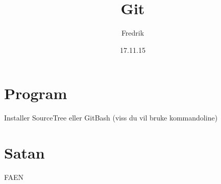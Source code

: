 \documentclass{article}
\title{Git}
\author{Fredrik}
\date{17.11.15}
\begin{document}
    \maketitle
    \section{Program}
    Installer SourceTree eller GitBash (viss du vil bruke kommandoline)

    \section{Satan}
    FAEN
\end{document}
